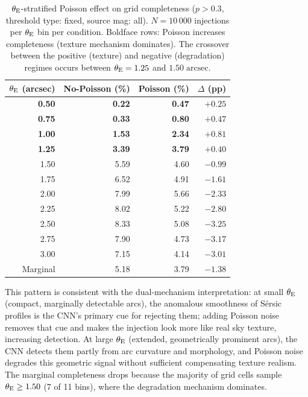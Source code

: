 \documentclass[fleqn,usenatbib]{rasti}
\begin{document}
\begin{table}
\centering
\caption{$\theta_{\rm E}$-stratified Poisson effect on grid completeness ($p > 0.3$, threshold type: fixed, source mag: all).  $N = 10\,000$ injections per $\theta_{\rm E}$ bin per condition.  Boldface rows: Poisson increases completeness (texture mechanism dominates).  The crossover between the positive (texture) and negative (degradation) regimes occurs between $\theta_{\rm E} = 1.25$ and $1.50\;\mathrm{arcsec}$.}
\label{tab:theta_e_poisson}
\begin{tabular}{rrrr}
\hline
$\theta_{\rm E}$ (arcsec) & No-Poisson (\%) & Poisson (\%) & $\Delta$ (pp) \\
\hline
\textbf{0.50} & \textbf{0.22} & \textbf{0.47} & $\mathbf{+0.25}$ \\
\textbf{0.75} & \textbf{0.33} & \textbf{0.80} & $\mathbf{+0.47}$ \\
\textbf{1.00} & \textbf{1.53} & \textbf{2.34} & $\mathbf{+0.81}$ \\
\textbf{1.25} & \textbf{3.39} & \textbf{3.79} & $\mathbf{+0.40}$ \\
1.50 & 5.59 & 4.60 & $-0.99$ \\
1.75 & 6.52 & 4.91 & $-1.61$ \\
2.00 & 7.99 & 5.66 & $-2.33$ \\
2.25 & 8.02 & 5.22 & $-2.80$ \\
2.50 & 8.33 & 5.08 & $-3.25$ \\
2.75 & 7.90 & 4.73 & $-3.17$ \\
3.00 & 7.15 & 4.14 & $-3.01$ \\
\hline
Marginal & 5.18 & 3.79 & $-1.38$ \\
\hline
\end{tabular}
\end{table}

This pattern is consistent with the dual-mechanism interpretation: at small $\theta_{\rm E}$ (compact, marginally detectable arcs), the anomalous smoothness of S\'{e}rsic profiles is the CNN's primary cue for rejecting them; adding Poisson noise removes that cue and makes the injection look more like real sky texture, increasing detection.  At large $\theta_{\rm E}$ (extended, geometrically prominent arcs), the CNN detects them partly from arc curvature and morphology, and Poisson noise degrades this geometric signal without sufficient compensating texture realism.  The marginal completeness drops because the majority of grid cells sample $\theta_{\rm E} \geq 1.50$ (7 of 11 bins), where the degradation mechanism dominates.
\end{document}
